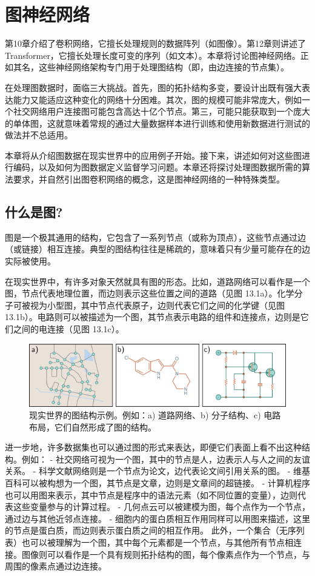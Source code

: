 \chapter{图神经网络}

第10章介绍了卷积网络，它擅长处理规则的数据阵列（如图像）。第12章则讲述了 Transformer，它擅长处理长度可变的序列（如文本）。本章将讨论图神经网络。正如其名，这些神经网络架构专门用于处理图结构（即，由边连接的节点集）。

在处理图数据时，面临三大挑战。首先，图的拓扑结构多变，要设计出既有强大表达能力又能适应这种变化的网络十分困难。其次，图的规模可能非常庞大，例如一个社交网络用户连接图可能包含高达十亿个节点。第三，可能只能获取到一个庞大的单体图，这就意味着常规的通过大量数据样本进行训练和使用新数据进行测试的做法并不总适用。

本章将从介绍图数据在现实世界中的应用例子开始。接下来，讲述如何对这些图进行编码，以及如何为图数据定义监督学习问题。本章还将探讨处理图数据所需的算法要求，并自然引出图卷积网络的概念，这是图神经网络的一种特殊类型。
\section{什么是图?}
图是一个极其通用的结构，它包含了一系列节点（或称为顶点），这些节点通过边（或链接）相互连接。典型的图结构往往是稀疏的，意味着只有少量可能存在的边实际被使用。

在现实世界中，有许多对象天然就具有图的形态。比如，道路网络可以看作是一个图，节点代表地理位置，而边则表示这些位置之间的道路（见图 13.1a）。化学分子可被视为小型图，其中节点代表原子，边则代表它们之间的化学键（见图 13.1b）。电路则可以被描述为一个图，其节点表示电路的组件和连接点，边则是它们之间的电连接（见图 13.1c）。

\begin{figure}[ht!]
\centering
\includegraphics[width=0.7\linewidth]{png/chapter13/GraphRealWorld.png}
\caption{现实世界的图结构示例。例如：a) 道路网络、b) 分子结构、c) 电路布局，它们自然形成了图的结构。}
\end{figure}


进一步地，许多数据集也可以通过图的形式来表达，即便它们表面上看不出这种结构。例如：
- 社交网络可视为一个图，其中的节点是人，边表示人与人之间的友谊关系。
- 科学文献网络则是一个节点为论文，边代表论文间引用关系的图。
- 维基百科可以被构想为一个图，其节点是文章，边则是文章间的超链接。
- 计算机程序也可以用图来表示，其中节点是程序中的语法元素（如不同位置的变量），边则代表这些变量参与的计算过程。
- 几何点云可以被建模为图，每个点作为一个节点，通过边与其他近邻点连接。
- 细胞内的蛋白质相互作用同样可以用图来描述，这里的节点是蛋白质，而边则表示蛋白质之间的相互作用。
此外，一个集合（无序列表）也可以被理解为一个图，其中每个元素都是一个节点，与其他所有节点相连接。图像则可以看作是一个具有规则拓扑结构的图，每个像素点作为一个节点，与周围的像素点通过边连接。

